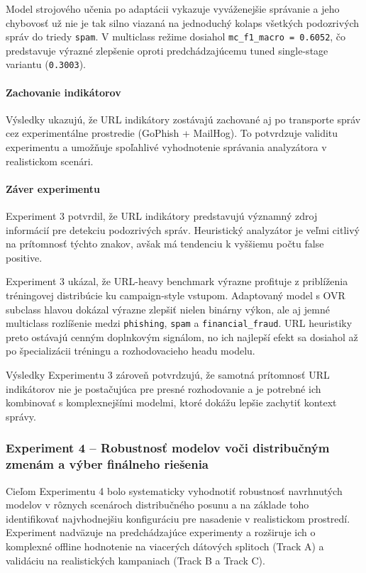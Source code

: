 \documentclass[conference]{IEEEtran}
\begin{document}
Model strojového učenia po adaptácii vykazuje vyváženejšie správanie a jeho chybovosť už nie je tak silno viazaná na jednoduchý kolaps všetkých podozrivých správ do triedy \texttt{spam}. V multiclass režime dosiahol \texttt{mc\_f1\_macro = 0.6052}, čo predstavuje výrazné zlepšenie oproti predchádzajúcemu tuned single-stage variantu (\texttt{0.3003}).

\paragraph{Zachovanie indikátorov}

Výsledky ukazujú, že URL indikátory zostávajú zachované aj po transporte správ cez experimentálne prostredie (GoPhish + MailHog). To potvrdzuje validitu experimentu a umožňuje spoľahlivé vyhodnotenie správania analyzátora v realistickom scenári.

\paragraph{Záver experimentu}

Experiment 3 potvrdil, že URL indikátory predstavujú významný zdroj informácií pre detekciu podozrivých správ. Heuristický analyzátor je veľmi citlivý na prítomnosť týchto znakov, avšak má tendenciu k vyššiemu počtu false positive.

Experiment 3 ukázal, že URL-heavy benchmark výrazne profituje z priblíženia tréningovej distribúcie ku campaign-style vstupom. Adaptovaný model s OVR subclass hlavou dokázal výrazne zlepšiť nielen binárny výkon, ale aj jemné multiclass rozlíšenie medzi \texttt{phishing}, \texttt{spam} a \texttt{financial\_fraud}. URL heuristiky preto ostávajú cenným doplnkovým signálom, no ich najlepší efekt sa dosiahol až po špecializácii tréningu a rozhodovacieho headu modelu.

Výsledky Experimentu 3 zároveň potvrdzujú, že samotná prítomnosť URL indikátorov nie je postačujúca pre presné rozhodovanie a je potrebné ich kombinovať s komplexnejšími modelmi, ktoré dokážu lepšie zachytiť kontext správy.

\subsubsection{Experiment 4 – Robustnosť modelov voči distribučným zmenám a výber finálneho riešenia}\label{exp4}

Cieľom Experimentu 4 bolo systematicky vyhodnotiť robustnosť navrhnutých modelov
v rôznych scenároch distribučného posunu a na základe toho identifikovať
najvhodnejšiu konfiguráciu pre nasadenie v realistickom prostredí.
Experiment nadväzuje na predchádzajúce experimenty a rozširuje ich o
komplexné offline hodnotenie na viacerých dátových splitoch (Track A)
a validáciu na realistických kampaniach (Track B a Track C).
\end{document}
